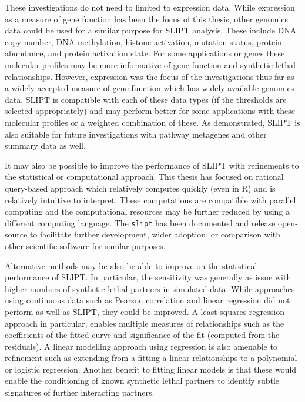 These investigations do not need to limited to expression data. While expression as a measure of gene function has been the focus of this thesis, other genomics data could be used for a similar purpose for \gls{SLIPT} analysis. These include \acrshort{DNA} copy number, \acrshort{DNA} methylation, histone activation, mutation status, protein abundance, and protein activation state. For some applications or genes these molecular profiles may be more informative of gene function and synthetic lethal relationships. However, expression was the focus of the investigations thus far as a widely accepted measure of gene function which has widely available genomics data.  \gls{SLIPT} is compatible with each of these data types (if the thresholds are selected appropriately) and may perform better for some applications with these molecular profiles or a weighted combination of these. As demonstrated, \gls{SLIPT} is also suitable for future investigations with pathway metagenes and other summary data as well.

It may also be possible to improve the performance of \gls{SLIPT} with refinements to the statistical or computational approach. This thesis has focused on rational query-based approach which relatively computes quickly (even in R) and is relatively intuitive to interpret. These computations are compatible with parallel computing and the computational resources may be further reduced by using a different computing language. The \texttt{slipt} has been documented and release open-source to facilitate further development, wider adoption, or comparison with other scientific software for similar purposes. 

Alternative methods may be also be able to improve on the statistical performance of \gls{SLIPT}. In particular, the sensitivity was generally as issue with higher numbers of synthetic lethal partners in simulated data. While approaches using continuous data such as Pearson correlation and linear regression did not perform as well as \gls{SLIPT}, they could be improved. A least squares regression approach in particular, enables multiple measures of relationships such as the coefficients of the fitted curve and significance of the fit (computed from the residuals). A linear modelling approach using regression is also amenable to refinement such as extending from a fitting a linear relationships to a polynomial or logistic regression. Another benefit to fitting linear models is that these would enable the conditioning of known synthetic lethal partners to identify subtle signatures of further interacting partners.

